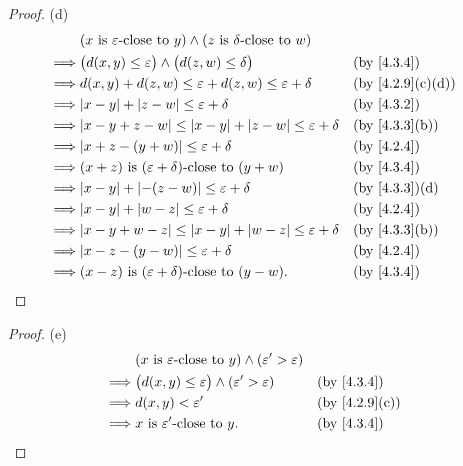 \begin{proof}{(d)}
	\begin{align*}
		         & (x \text{ is \(\varepsilon\)-close to } y) \land (z \text{ is \(\delta\)-close to } w)                                     \\
		\implies & \big(d(x, y) \leq \varepsilon\big) \land \big(d(z, w) \leq \delta\big)                 &  & \by{4.3.4}                     \\
		\implies & d(x, y) + d(z, w) \leq \varepsilon + d(z, w) \leq \varepsilon + \delta                 &  & \text{(by \cref{4.2.9}(c)(d))} \\
		\implies & \abs{x - y} + \abs{z - w} \leq \varepsilon + \delta                                    &  & \by{4.3.2}                     \\
		\implies & \abs{x - y + z - w} \leq \abs{x - y} + \abs{z - w} \leq \varepsilon + \delta           &  & \text{(by \cref{4.3.3}(b))}    \\
		\implies & \abs{x + z - (y + w)} \leq \varepsilon + \delta                                        &  & \by{4.2.4}                     \\
		\implies & (x + z) \text{ is \((\varepsilon + \delta)\)-close to } (y + w)                        &  & \by{4.3.4}                     \\
		\implies & \abs{x - y} + \abs{-(z - w)} \leq \varepsilon + \delta                                 &  & \text{(by \cref{4.3.3})(d)}    \\
		\implies & \abs{x - y} + \abs{w - z} \leq \varepsilon + \delta                                    &  & \by{4.2.4}                     \\
		\implies & \abs{x - y + w - z} \leq \abs{x - y} + \abs{w - z} \leq \varepsilon + \delta           &  & \text{(by \cref{4.3.3}(b))}    \\
		\implies & \abs{x - z - (y - w)} \leq \varepsilon + \delta                                        &  & \by{4.2.4}                     \\
		\implies & (x - z) \text{ is \((\varepsilon + \delta)\)-close to } (y - w).                       &  & \by{4.3.4}
	\end{align*}
\end{proof}

\begin{proof}{(e)}
	\begin{align*}
		         & (x \text{ is \(\varepsilon\)-close to } y) \land (\varepsilon' > \varepsilon)                                  \\
		\implies & \big(d(x, y) \leq \varepsilon\big) \land (\varepsilon' > \varepsilon)         &  & \by{4.3.4}                  \\
		\implies & d(x, y) < \varepsilon'                                                        &  & \text{(by \cref{4.2.9}(c))} \\
		\implies & x \text{ is \(\varepsilon'\)-close to } y.                                    &  & \by{4.3.4}
	\end{align*}
\end{proof}


